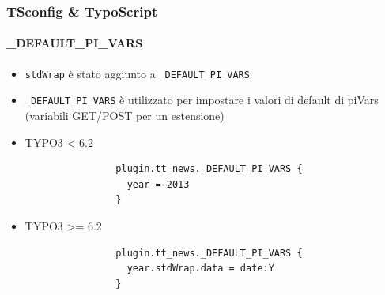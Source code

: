 
\begin{frame}[fragile]
	\frametitle{TSconfig \& TypoScript}
	\framesubtitle{\_DEFAULT\_PI\_VARS}

	\begin{itemize}
		\item \texttt{stdWrap} è stato aggiunto a \texttt{\_DEFAULT\_PI\_VARS}
		\item \texttt{\_DEFAULT\_PI\_VARS} è utilizzato per impostare i valori di default di piVars (variabili GET/POST per un estensione)

		\item TYPO3 < 6.2
			\begin{lstlisting}
				plugin.tt_news._DEFAULT_PI_VARS {
				  year = 2013
				}
			\end{lstlisting}

		\item TYPO3 >= 6.2
			\begin{lstlisting}
				plugin.tt_news._DEFAULT_PI_VARS {
				  year.stdWrap.data = date:Y
				}
			\end{lstlisting}

	\end{itemize}

\end{frame}


